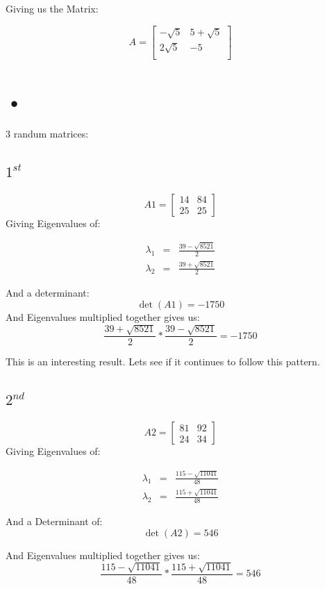 \documentclass[12pt]{article}
\begin{document}
Giving us the Matrix:

\[
A = 
\begin{bmatrix}
-\sqrt{5} & 5 + \sqrt{5} \\
2\sqrt{5} & -5\\
\end{bmatrix}
\]

\section{•}

3 randum matrices:

\subsection*{$1^{st}$}
\[
A1 = 
\begin{bmatrix}
14 & 84\\
25 & 25
\end{bmatrix}
\]
Giving Eigenvalues of:

\begin{eqnarray*}
\lambda_1 &=& \frac{39 - \sqrt{8521}}{2}\\
\lambda_2 &=& \frac{39 + \sqrt{8521}}{2}
\end{eqnarray*}

And a determinant:
$$ \det (A1) = -1750 $$
And Eigenvalues multiplied together gives us:
$$ \frac{39 + \sqrt{8521}}{2} * \frac{39 - \sqrt{8521}}{2} = -1750 $$

This is an interesting result. Lets see if it continues to follow this pattern.

\subsection*{$2^{nd}$}
\[
A2 =
\begin{bmatrix}
81 & 92\\
24 & 34
\end{bmatrix}
\]
Giving Eigenvalues of:

\begin{eqnarray*}
\lambda_1 &=& \frac{115 - \sqrt{11041}}{48}\\
\lambda_2 &=& \frac{115 + \sqrt{11041}}{48}
\end{eqnarray*}

And a Determinant of:
$$ \det (A2) = 546 $$

And Eigenvalues multiplied together gives us:
$$ \frac{115 - \sqrt{11041}}{48} * \frac{115 + \sqrt{11041}}{48} = 546 $$
\end{document}
